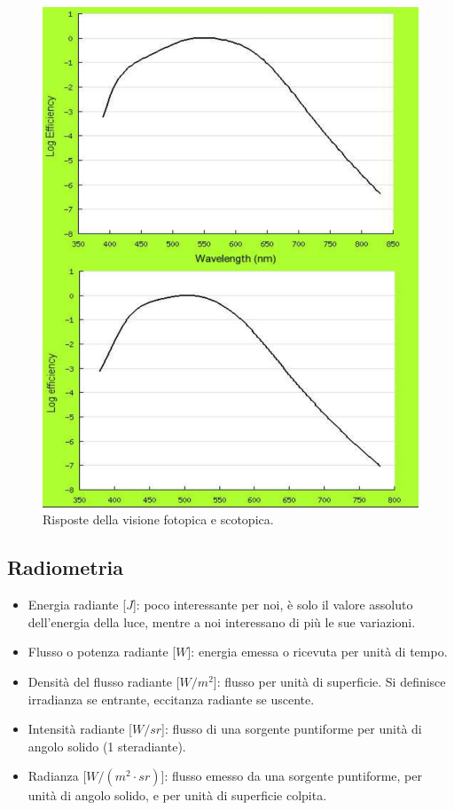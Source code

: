 \documentclass[a4paper,11pt]{article}
\begin{document}
\newpage
\renewcommand{\thefigure}{2.1}
\begin{figure}[!h]
  \centering
    \includegraphics[scale=0.4]{images/2/cones_rods_sensitivity.png}
    \caption{Risposte della visione fotopica e scotopica.}
\end{figure}

\subsection{Radiometria}
\begin{itemize}
    \item Energia radiante [$J$]: poco interessante per noi, è solo il valore assoluto dell'energia della luce, mentre a noi interessano di più le sue variazioni.
    \item Flusso o potenza radiante [$W$]: energia emessa o ricevuta per unità di tempo.
    \item Densità del flusso radiante [$W/m^2$]: flusso per unità di superficie. Si definisce irradianza se entrante, eccitanza radiante se uscente.
    \item Intensità radiante [$W/sr$]: flusso di una sorgente puntiforme per unità di angolo solido (1 steradiante).
    \item Radianza [$W/(m^2 \cdot sr)$]: flusso emesso da una sorgente puntiforme, per unità di angolo solido, e per unità di superficie colpita.
\end{itemize}
\end{document}
